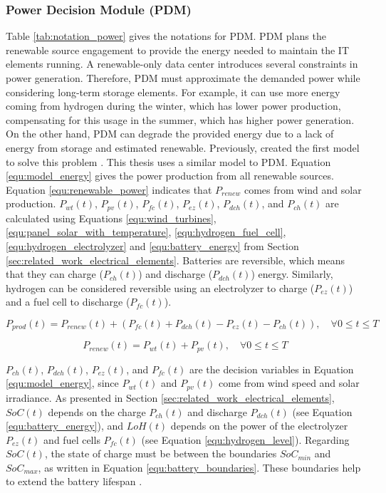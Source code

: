 \subsubsection{Power Decision Module (PDM)}
Table \ref{tab:notation_power} gives the notations for PDM. PDM plans the renewable source engagement to provide the energy needed to maintain the IT elements running. A renewable-only data center introduces several constraints in power generation. Therefore, PDM must approximate the demanded power while considering long-term storage elements. For example, it can use more energy coming from hydrogen during the winter, which has lower power production, compensating for this usage in the summer, which has higher power generation. On the other hand, PDM can degrade the provided energy due to a lack of energy from storage and estimated renewable. Previously, \citeauthor{haddad2019mixed} created the first model to solve this problem \cite{haddad2019mixed}. This thesis uses a similar model to PDM. Equation \ref{equ:model_energy} gives the power production from all renewable sources. Equation \ref{equ:renewable_power} indicates that $P_{renew}$ comes from wind and solar production. $P_{wt}(t)$, $P_{pv}(t)$, $P_{fc}(t)$, $P_{ez}(t)$, $P_{dch}(t)$, and $P_{ch}(t)$ are calculated using Equations \ref{equ:wind_turbines}, \ref{equ:panel_solar_with_temperature}, \ref{equ:hydrogen_fuel_cell}, \ref{equ:hydrogen_electrolyzer} and \ref{equ:battery_energy} from Section \ref{sec:related_work_electrical_elements}. Batteries are reversible, which means that they can charge ($P_{ch}(t)$) and discharge ($P_{dch}(t)$) energy. Similarly, hydrogen can be considered reversible using an electrolyzer to charge ($P_{ez}(t)$) and a fuel cell to discharge ($P_{fc}(t)$). 



\begin{equation}
    \label{equ:model_energy}
    P_{prod}(t) = P_{renew}(t) + (P_{fc}(t) + P_{dch}(t) - P_{ez}(t) - P_{ch}(t)), \quad \forall 0 \le t \le T
\end{equation}

\begin{equation}
    \label{equ:renewable_power}
    P_{renew}(t) = P_{wt}(t) + P_{pv}(t), \quad \forall 0 \le t \le T
\end{equation}

$P_{ch}(t)$, $P_{dch}(t)$, $P_{ez}(t)$, and $P_{fc}(t)$ are the decision variables in Equation \ref{equ:model_energy}, since $P_{wt}(t)$ and $P_{pv}(t)$ come from wind speed and solar irradiance. As presented in Section \ref{sec:related_work_electrical_elements}, $SoC(t)$ depends on the charge $P_{ch}(t)$ and discharge $P_{dch}(t)$ (see Equation \ref{equ:battery_energy}), and $LoH(t)$ depends on the power of the electrolyzer $P_{ez}(t)$ and fuel cells $P_{fc}(t)$ (see Equation \ref{equ:hydrogen_level}). Regarding $SoC(t)$, the state of charge must be between the boundaries $SoC_{min}$ and $SoC_{max}$, as written in Equation \ref{equ:battery_boundaries}. These boundaries help to extend the battery lifespan \cite{xu2016modeling}.

